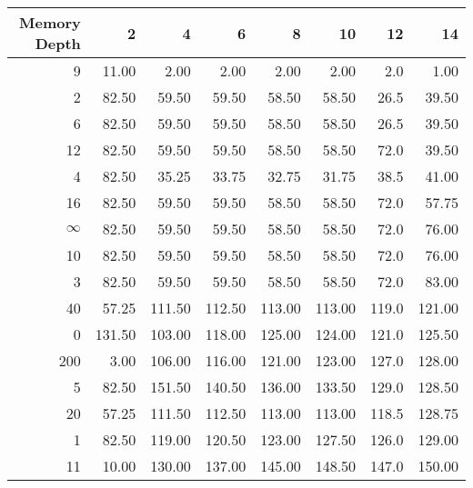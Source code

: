 \begin{tabular}{rrrrrrrr}
\toprule
 Memory Depth &       2 &       4 &       6 &       8 &      10 &     12 &      14 \\
\midrule
            9 &   11.00 &    2.00 &    2.00 &    2.00 &    2.00 &    2.0 &    1.00 \\
            2 &   82.50 &   59.50 &   59.50 &   58.50 &   58.50 &   26.5 &   39.50 \\
            6 &   82.50 &   59.50 &   59.50 &   58.50 &   58.50 &   26.5 &   39.50 \\
           12 &   82.50 &   59.50 &   59.50 &   58.50 &   58.50 &   72.0 &   39.50 \\
            4 &   82.50 &   35.25 &   33.75 &   32.75 &   31.75 &   38.5 &   41.00 \\
           16 &   82.50 &   59.50 &   59.50 &   58.50 &   58.50 &   72.0 &   57.75 \\
           $\infty$ &   82.50 &   59.50 &   59.50 &   58.50 &   58.50 &   72.0 &   76.00 \\
           10 &   82.50 &   59.50 &   59.50 &   58.50 &   58.50 &   72.0 &   76.00 \\
            3 &   82.50 &   59.50 &   59.50 &   58.50 &   58.50 &   72.0 &   83.00 \\
           40 &   57.25 &  111.50 &  112.50 &  113.00 &  113.00 &  119.0 &  121.00 \\
            0 &  131.50 &  103.00 &  118.00 &  125.00 &  124.00 &  121.0 &  125.50 \\
          200 &    3.00 &  106.00 &  116.00 &  121.00 &  123.00 &  127.0 &  128.00 \\
            5 &   82.50 &  151.50 &  140.50 &  136.00 &  133.50 &  129.0 &  128.50 \\
           20 &   57.25 &  111.50 &  112.50 &  113.00 &  113.00 &  118.5 &  128.75 \\
            1 &   82.50 &  119.00 &  120.50 &  123.00 &  127.50 &  126.0 &  129.00 \\
           11 &   10.00 &  130.00 &  137.00 &  145.00 &  148.50 &  147.0 &  150.00 \\
\bottomrule
\end{tabular}
